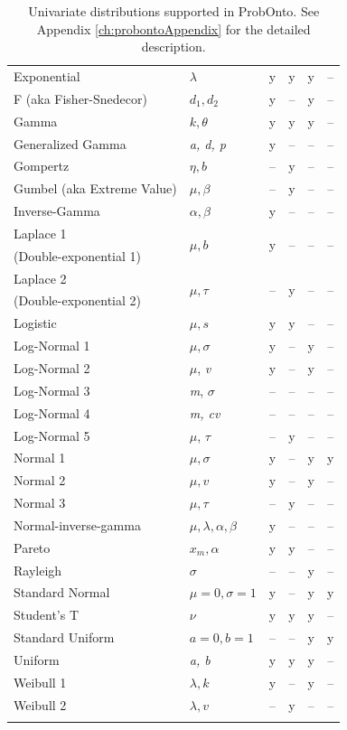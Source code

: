 {\begin{center}
\begin{longtable}{l | lcccc}
Exponential			& $\lambda$		&	y	&	y	&	y	&  -- \\
F (aka Fisher-Snedecor)	& $d_1, d_2$		&	y	& --  &	y	&  -- \\
Gamma				& $k, \theta$		&	y	&	y	&	y	&  -- \\
Generalized Gamma	& \emph{a, d, p}	&	y	& --  & --  & --	  \\
Gompertz				& $\eta, b$		& --  &	y	& --  & --	  \\
Gumbel (aka Extreme Value)	& $\mu, \beta$	& --  &	y 	& --  & -- \\ 
Inverse-Gamma		& $\alpha, \beta$	&	y	& --  & --  &  -- \\
Laplace 1				& \multirow{2}{*}{$\mu, b$} &	\multirow{2}{*}{y}	&	\multirow{2}{*}{--}	& \multirow{2}{*}{--}  & \multirow{2}{*}{--} \\ [-0.5ex]
(Double-exponential 1) \\
Laplace 2				& \multirow{2}{*}{$\mu, \tau$} &	\multirow{2}{*}{--}	&	\multirow{2}{*}{y}	& \multirow{2}{*}{--}  & \multirow{2}{*}{--} \\ [-0.5ex]
(Double-exponential 2) \\[0.5ex]
Logistic				& $\mu, s$		&	y	&	y	& --  &  -- \\[0.5ex]
Log-Normal 1			& $\mu, \sigma$	&	y	&	--	&	y	&  -- \\
Log-Normal 2			& $\mu$, \textit{v}	&	y	&	--	&	y	&  -- \\
Log-Normal 3			& \emph{m}, $\sigma$	&	--	&	--	&	--	&  -- \\
Log-Normal 4			& \emph{m, cv}		& 	--	&	--	&	--	&  -- \\
Log-Normal 5			& $\mu$, $\tau$	& 	--	&	y	&	--	&  -- \\[0.5ex]
Normal 1				& $\mu, \sigma$	&	y	&	--	&	y	& y  \\
Normal 2				& $\mu, v$		&	y	&	--	&	y	&  -- \\
Normal 3				& $\mu, \tau$		&	--	&	y	&	--	&  -- \\[0.5ex]
Normal-inverse-gamma	& $\mu, \lambda, \alpha, \beta$	& y	& --  & --  &  -- \\
Pareto				& $x_m, \alpha$	& y	& y	& --  &  -- \\
Rayleigh				& $\sigma$		& --  & --  & y	&  -- \\
Standard Normal 		& $\mu\!=\!0, \sigma\!=\!1$	& y & -- &	 y & y  \\
Student's T			& $\nu$			& y	& y	& y	&  -- \\
Standard Uniform		& $a\!=\!0, b\!=\!1$		& --	& --	& y & y  \\
Uniform				&  \emph{a, b}		& y	& y	& y		& --  \\
Weibull 1				& $\lambda, k$		& y	& --	& y	&  -- \\
Weibull 2				& $\lambda, v$		& --	& y	& --	&  -- \\
   \hline 
\caption{Univariate distributions supported in ProbOnto. See Appendix \ref{ch:probontoAppendix} 
for the detailed description.}
\label{figTable:univariates}
\vspace{-2.5em}
\end{longtable}
\end{center}

}

